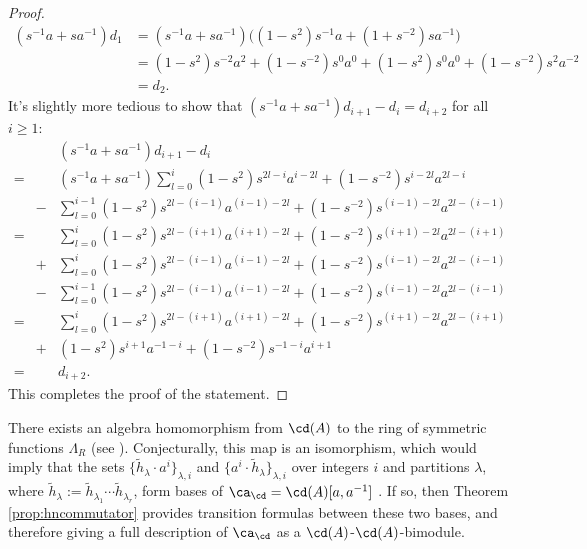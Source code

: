 \begin{proof}
\begin{align*}
( s^{-1} a + s a^{-1} ) d_1 &= ( s^{-1} a + s a^{-1} ) \big( ( 1 - s^2 ) s^{-1} a + ( 1 + s^{-2} ) s a^{-1} \big) \\
&= ( 1 - s^2 ) s^{-2} a^2 + (1 - s^{-2} ) s^0 a^0 + ( 1 - s^2 ) s^0 a^0 + ( 1 - s^{-2} ) s^2 a^{-2} \\
&= d_2.
\end{align*}
It's slightly more tedious to show that $( s^{-1} a + s a^{-1} ) d_{i+1} - d_i = d_{i+2}$ for all $i \geq 1$:
\begin{eqnarray*}
&&( s^{-1} a + s a^{-1} ) d_{i+1} - d_i \\
=&& ( s^{-1} a + s a^{-1} ) \sum_{l=0}^{i} (1 - s^2) s^{2l-i} a^{i-2l} + (1 - s^{-2}) s^{i-2l} a^{2l-i} \\
&-& \sum_{l=0}^{i-1} (1 - s^2) s^{2l-(i-1)} a^{(i-1)-2l} + (1 - s^{-2}) s^{(i-1)-2l} a^{2l-(i-1)} \\
=&& \sum_{l=0}^{i} (1 - s^2) s^{2l-(i+1)} a^{(i+1)-2l} + (1 - s^{-2}) s^{(i+1)-2l} a^{2l-(i+1)} \\
&+& \sum_{l=0}^{i} (1 - s^2) s^{2l-(i-1)} a^{(i-1)-2l} + (1 - s^{-2}) s^{(i-1)-2l} a^{2l-(i-1)} \\
&-& \sum_{l=0}^{i-1} (1 - s^2) s^{2l-(i-1)} a^{(i-1)-2l} + (1 - s^{-2}) s^{(i-1)-2l} a^{2l-(i-1)} \\
=&& \sum_{l=0}^{i} (1 - s^2) s^{2l-(i+1)} a^{(i+1)-2l} + (1 - s^{-2}) s^{(i+1)-2l} a^{2l-(i+1)} \\
&+& (1 - s^2) s^{i+1} a^{-1-i} + (1 - s^{-2}) s^{-1-i} a^{i+1} \\
=&& d_{i+2}.
\end{eqnarray*}
This completes the proof of the statement. 
\end{proof}

\begin{remark}
There exists an algebra homomorphism from $\cd(A)$ to the ring of symmetric functions $\Lambda_R$ (see ). Conjecturally, this map is an isomorphism, which would imply that the sets $\{ \tilde{h}_\lambda \cdot a^i \}_{\lambda, i}$ and $\{ a^i \cdot \tilde{h}_\lambda \}_{\lambda, i}$ over integers $i$ and partitions $\lambda$, where $\tilde{h}_\lambda := \tilde{h}_{\lambda_1} \cdots \tilde{h}_{\lambda_r}$, form bases of $\ca_\cd = \cd(A)[a, a^{-1}]$ . If so, then Theorem \ref{prop:hncommutator} provides transition formulas between these two bases, and therefore giving a full description of $\ca_\cd$ as a $\cd(A)$-$\cd(A)$-bimodule. 
\end{remark}

